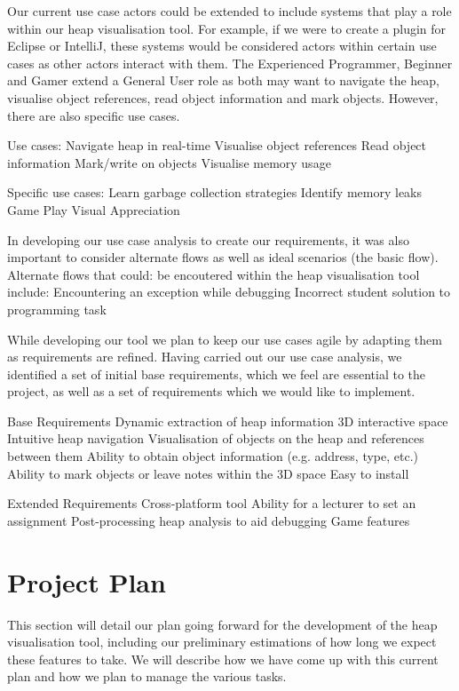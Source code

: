 \documentclass[10pt, a4paper]{article}
\begin{document}
Our current use case actors could be extended to include systems that play a role within our heap visualisation tool. For example, if we were to create a plugin for Eclipse or IntelliJ, these systems would be considered actors within certain use cases as other actors interact with them. The Experienced Programmer, Beginner and Gamer extend a General User role as both may want to navigate the heap, visualise object references, read object information and mark objects. However, there are also specific use cases.

Use cases:
Navigate heap in real-time
Visualise object references
Read object information
Mark/write on objects 
Visualise memory usage

Specific use cases:
Learn garbage collection strategies
Identify memory leaks
Game Play
Visual Appreciation

In developing our use case analysis to create our requirements, it was also important to consider alternate flows as well as ideal scenarios (the basic flow). Alternate flows that could: be encoutered within the heap visualisation tool include:
Encountering an exception while debugging
Incorrect student solution to programming task

While developing our tool we plan to keep our use cases agile by adapting them as requirements are refined. Having carried out our use case analysis, we identified a set of initial base requirements, which we feel are essential to the project, as well as a set of requirements which we would like to implement.

Base Requirements
Dynamic extraction of heap information
3D interactive space
Intuitive heap navigation
Visualisation of objects on the heap and references between them
Ability to obtain object information (e.g. address, type, etc.) 
Ability to mark objects or leave notes within the 3D space
Easy to install

Extended Requirements
Cross-platform tool
Ability for a lecturer to set an assignment
Post-processing heap analysis to aid debugging
Game features

\section{Project Plan}

This section will detail our plan going forward for the development of the heap visualisation tool, including our preliminary estimations of how long we expect these features to take. We will describe how we have come up with this current plan and how we plan to manage the various tasks. 
\end{document}
